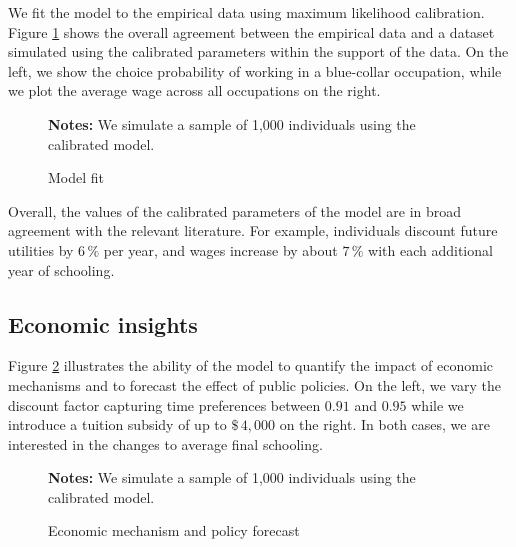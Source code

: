 \noindent We fit the model to the empirical data using maximum likelihood calibration. Figure \ref{Model fit} shows the overall agreement between the empirical data and a dataset simulated using the calibrated parameters within the support of the data. On the left, we show the choice probability of working in a blue-collar occupation, while we plot the average wage across all occupations on the right.
%
\begin{figure}[h!]\centering
\caption{Model fit}\label{Model fit}
\hspace{0.3cm}
\begin{center}
\begin{minipage}[t]{0.7\columnwidth}
\item \scriptsize{\textbf{Notes:} We simulate a sample of 1,000 individuals using the calibrated model.}
\end{minipage}\end{center}
\end{figure}\FloatBarrier
%
\noindent Overall, the values of the calibrated parameters of the model are in broad agreement with the relevant literature. For example, individuals discount future utilities by $6\,\%$ per year, and wages increase by about $7\,\%$ with each additional year of schooling.
\subsection{Economic insights}
Figure \ref{Economic mechanism and policy forecast} illustrates the ability of the model to quantify the impact of economic mechanisms and to forecast the effect of public policies. On the left, we vary the discount factor capturing time preferences between $0.91$ and $0.95$ while we introduce a tuition subsidy of up to $\$\,4,000$ on the right. In both cases, we are interested in the changes to average final schooling.

\begin{figure}[h!]\centering
\caption{Economic mechanism and policy forecast}\label{Economic mechanism and policy forecast}
\hspace{0.3cm}
\begin{center}
\begin{minipage}[t]{0.675\columnwidth}
\item \scriptsize{\textbf{Notes:} We simulate a sample of 1,000 individuals using the calibrated model.}
\end{minipage}
\end{center}
\end{figure}\FloatBarrier

